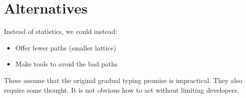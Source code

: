 \section{Alternatives}


Instead of statistics, we could instead:
\begin{itemize}
\item
  Offer fewer paths (smaller lattice)
\item
  Make tools to avoid the bad paths
\end{itemize}
These assume that the original gradual typing promise is impractical.
They also require some thought.
It is not obvious how to act without limiting developers.

